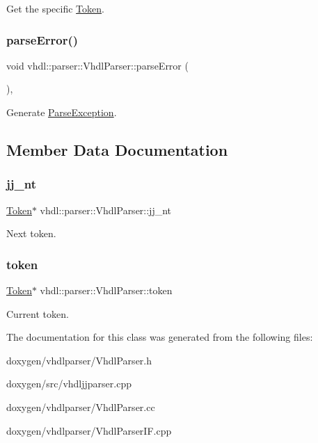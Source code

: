 Get the specific \mbox{\hyperlink{classvhdl_1_1parser_1_1_token}{Token}}. \mbox{\label{classvhdl_1_1parser_1_1_vhdl_parser_a3e87ec86b2b0a06929dcb23c7bf38622}} 
\subsubsection{\texorpdfstring{parseError()}{parseError()}}
{\footnotesize\ttfamily void vhdl\+::parser\+::\+Vhdl\+Parser\+::parse\+Error (\begin{DoxyParamCaption}{ }\end{DoxyParamCaption})\hspace{0.3cm}{\ttfamily [protected]}, {\ttfamily [virtual]}}

Generate \mbox{\hyperlink{classvhdl_1_1parser_1_1_parse_exception}{Parse\+Exception}}. 

\subsection{Member Data Documentation}
\mbox{\label{classvhdl_1_1parser_1_1_vhdl_parser_a0dd07751fdbbf311b3480ccb3c4b1dfe}} 
\subsubsection{\texorpdfstring{jj\_nt}{jj\_nt}}
{\footnotesize\ttfamily \mbox{\hyperlink{classvhdl_1_1parser_1_1_token}{Token}}$\ast$ vhdl\+::parser\+::\+Vhdl\+Parser\+::jj\+\_\+nt}

Next token. \mbox{\label{classvhdl_1_1parser_1_1_vhdl_parser_a608c6d5c2adcbf09ce69f0123e223893}} 
\subsubsection{\texorpdfstring{token}{token}}
{\footnotesize\ttfamily \mbox{\hyperlink{classvhdl_1_1parser_1_1_token}{Token}}$\ast$ vhdl\+::parser\+::\+Vhdl\+Parser\+::token}

Current token. 

The documentation for this class was generated from the following files\+:\begin{DoxyCompactItemize}
\item 
doxygen/vhdlparser/Vhdl\+Parser.\+h\item 
doxygen/src/vhdljjparser.\+cpp\item 
doxygen/vhdlparser/Vhdl\+Parser.\+cc\item 
doxygen/vhdlparser/Vhdl\+Parser\+I\+F.\+cpp\end{DoxyCompactItemize}
